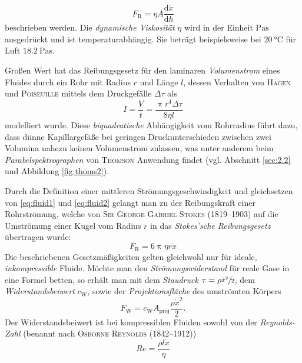 \begin{equation}
\label{eq:fluid1}
F_\mathrm{R}=\eta A\frac{\mathrm{d}\dot{x}}{\mathrm{d}h}
\end{equation} 
beschrieben werden. Die \textit{dynamische Viskosität} $\eta$ wird in der Einheit $\si{\pascal\second}$ ausgedrückt und ist temperaturabhängig. Sie beträgt beispielsweise bei $\SI{20}{\celsius}$ für Luft $\SI{18.2}{\pascal\second}$. \par

Großen Wert hat das Reibungsgesetz für den laminaren \textit{Volumenstrom} eines Fluides durch ein Rohr mit Radius $r$ und Länge $l$, dessen Verhalten von \textsc{Hagen} und \textsc{Poiseuille} mittels dem Druckgefälle $\Delta \tau$ als
\begin{equation}
\label{eq:fluid2}
I=\frac{V}{t}=\frac{\uppi r^4\Delta \tau}{8\eta l}
\end{equation} 
modelliert wurde. Diese \textit{biquadratische} Abhängigkeit vom Rohrradius führt dazu, dass dünne Kapillargefäße bei geringen Druckunterschieden zwischen zwei Volumina nahezu keinen Volumenstrom zulassen, was unter anderem beim \textit{Parabelspektrographen} von \textsc{Thomson} Anwendung findet (vgl. Abschnitt \ref{sec:2.2} und Abbildung \ref{fig:thoms2}).\par
Durch die Definition einer mittleren Strömungsgeschwindigkeit und gleichsetzen von \eqref{eq:fluid1} und \eqref{eq:fluid2} gelangt man zu der Reibungskraft einer Rohrströmung, welche von \textsc{Sir George Gabriel Stokes} (1819--1903) auf die Umströmung einer Kugel vom Radius $r$ in das \textit{Stokes'sche Reibungsgesetz} übertragen wurde:
\begin{equation}
\label{eq:fluid3}
F_\mathrm{R}=6\uppi \eta r \dot{x}
\end{equation}
Die beschriebenen Gesetzmäßigkeiten gelten gleichwohl nur für ideale, \textit{inkompressible} Fluide. Möchte man den \textit{Strömungswiderstand} für reale Gase in eine Formel betten, so erhält man mit dem \textit{Staudruck} $\tau=\rho\sfrac{\dot{x}^2}{2}$, dem \textit{Widerstandsbeiwert} $c_\mathrm{W}$, sowie der \textit{Projektionsfläche} des umströmten Körpers
\begin{equation}
\label{eq:fluid4}
F_\mathrm{W}=c_\mathrm{W}A_\mathrm{proj}\frac{\rho\dot{x}^2}{2}.
\end{equation} 
Der Widerstandsbeiwert ist bei kompressiblen Fluiden sowohl von der \textit{Reynolds-Zahl} (benannt nach \textsc{Osborne Reynolds} (1842--1912))
\begin{equation}
\label{eq:fluid5}
Re=\frac{\rho l \dot{x}}{\eta}
\end{equation}
